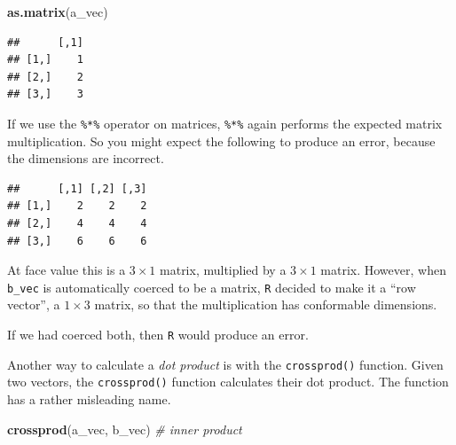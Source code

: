 \documentclass[]{book}
\newenvironment{Shaded}{\begin{snugshade}}{\end{snugshade}}
\newcommand{\KeywordTok}[1]{\textcolor[rgb]{0.13,0.29,0.53}{\textbf{#1}}}
\newcommand{\StringTok}[1]{\textcolor[rgb]{0.31,0.60,0.02}{#1}}
\newcommand{\CommentTok}[1]{\textcolor[rgb]{0.56,0.35,0.01}{\textit{#1}}}
\newcommand{\OperatorTok}[1]{\textcolor[rgb]{0.81,0.36,0.00}{\textbf{#1}}}
\newcommand{\NormalTok}[1]{#1}
\theoremstyle{definition}
\theoremstyle{definition}
\theoremstyle{definition}
\theoremstyle{remark}
\begin{document}
\begin{Shaded}
\begin{Highlighting}[]
\KeywordTok{as.matrix}\NormalTok{(a_vec)}
\end{Highlighting}
\end{Shaded}

\begin{verbatim}
##      [,1]
## [1,]    1
## [2,]    2
## [3,]    3
\end{verbatim}

If we use the \texttt{\%*\%} operator on matrices, \texttt{\%*\%} again
performs the expected matrix multiplication. So you might expect the
following to produce an error, because the dimensions are incorrect.

\begin{Shaded}
\end{Shaded}

\begin{verbatim}
##      [,1] [,2] [,3]
## [1,]    2    2    2
## [2,]    4    4    4
## [3,]    6    6    6
\end{verbatim}

At face value this is a \(3 \times 1\) matrix, multiplied by a
\(3 \times 1\) matrix. However, when \texttt{b\_vec} is automatically
coerced to be a matrix, \texttt{R} decided to make it a ``row vector'',
a \(1 \times 3\) matrix, so that the multiplication has conformable
dimensions.

If we had coerced both, then \texttt{R} would produce an error.

\begin{Shaded}
\end{Shaded}

Another way to calculate a \emph{dot product} is with the
\texttt{crossprod()} function. Given two vectors, the
\texttt{crossprod()} function calculates their dot product. The function
has a rather misleading name.

\begin{Shaded}
\begin{Highlighting}[]
\KeywordTok{crossprod}\NormalTok{(a_vec, b_vec)  }\CommentTok{# inner product}
\end{Highlighting}
\end{Shaded}
\end{document}
